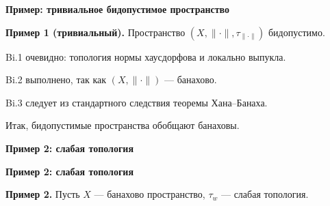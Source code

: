 \documentclass[11pt]{article}
\begin{document}
\begin{center}
{\color{notaeYELLOW}\bfseries\fontsize{44}{52}\selectfont Пример: тривиальное бидопустимое пространство}
\end{center}
\vspace*{\fill}
\begin{center}
\fontsize{36}{43}\selectfont
\parbox{\linewidth}{\centering\noindent \textbf{Пример 1 (тривиальный).} Пространство $(X,\|\cdot\|,\tau_{\|\cdot\|})$ бидопустимо.
\par}\vspace{0.4in}
\parbox{\linewidth}{\centering\noindent Bi.1 очевидно: топология нормы хаусдорфова и локально выпукла.
\par}\vspace{0.4in}
\parbox{\linewidth}{\centering\noindent Bi.2 выполнено, так как $(X,\|\cdot\|)$ --- банахово.
\par}\vspace{0.4in}
\parbox{\linewidth}{\centering\noindent Bi.3 следует из стандартного следствия теоремы Хана--Банаха.
\par}\vspace{0.4in}
\parbox{\linewidth}{\centering\noindent Итак, бидопустимые пространства обобщают банаховы.
\par}\vspace{0.4in}
\end{center}
\vspace*{\fill}

\newpage

\begin{center}
{\color{notaeYELLOW}\bfseries\fontsize{44}{52}\selectfont Пример 2: слабая топология}
\end{center}
\vspace*{\fill}
\begin{center}
\fontsize{36}{43}\selectfont
\end{center}
\vspace*{\fill}

\newpage

\begin{center}
{\color{notaeYELLOW}\bfseries\fontsize{44}{52}\selectfont Пример 2: слабая топология}
\end{center}
\vspace*{\fill}
\begin{center}
\fontsize{36}{43}\selectfont
\parbox{\linewidth}{\centering\noindent \textbf{Пример 2.} Пусть $X$ --- банахово пространство, $\tau_w$ --- слабая топология.
\par}\vspace{0.4in}
\end{center}
\vspace*{\fill}
\end{document}
